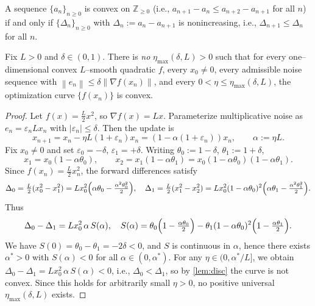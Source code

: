 \documentclass[10pt,a4paper]{amsart}
\newcommand{\norm}[1]{\left\lVert #1\right\rVert}
\begin{document}
\begin{lemma}\label{lem:disc}
A sequence $\{a_n\}_{n\ge0}$ is convex on $\mathbb{Z}_{\ge0}$ (i.e., $a_{n+1}-a_n\le a_{n+2}-a_{n+1}$ for all $n$) if and only if $\{\Delta_n\}_{n\ge0}$ with $\Delta_n:=a_n-a_{n+1}$ is nonincreasing, i.e., $\Delta_{n+1}\le \Delta_n$ for all $n$.
\end{lemma}

\begin{theorem}\label{thm:imposs}
Fix $L>0$ and $\delta\in(0,1)$. There is \emph{no} $\eta_{\max}(\delta,L)>0$ such that for every one--dimensional convex $L$--smooth quadratic $f$, every $x_0\ne0$, every admissible noise sequence with $\norm{e_n}\le\delta\norm{\nabla f(x_n)}$, and every $0<\eta\le \eta_{\max}(\delta,L)$, the optimization curve $\{f(x_n)\}$ is convex.
\end{theorem}

\begin{proof}
Let $f(x)=\tfrac{L}{2}x^2$, so $\nabla f(x)=Lx$. Parameterize multiplicative noise as $e_n=\varepsilon_n Lx_n$ with $|\varepsilon_n|\le \delta$. Then the update is
\[
x_{n+1}=x_n-\eta L(1+\varepsilon_n)x_n=(1-\alpha(1+\varepsilon_n))x_n,\qquad \alpha:=\eta L.
\]
Fix $x_0\ne0$ and set $\varepsilon_0=-\delta$, $\varepsilon_1=+\delta$. Writing $\theta_0:=1-\delta$, $\theta_1:=1+\delta$,
\[
x_1=x_0(1-\alpha\theta_0),\qquad x_2=x_1(1-\alpha\theta_1)=x_0(1-\alpha\theta_0)(1-\alpha\theta_1).
\]
Since $f(x_n)=\tfrac{L}{2}x_n^2$, the forward differences satisfy
\[
\Delta_0=\tfrac{L}{2}(x_0^2-x_1^2)=Lx_0^2\Bigl(\alpha\theta_0-\tfrac{\alpha^2\theta_0^2}{2}\Bigr),\quad
\Delta_1=\tfrac{L}{2}(x_1^2-x_2^2)=Lx_0^2(1-\alpha\theta_0)^2\Bigl(\alpha\theta_1-\tfrac{\alpha^2\theta_1^2}{2}\Bigr).
\]
Thus
\[
\Delta_0-\Delta_1=Lx_0^2\,\alpha\,S(\alpha),
\quad
S(\alpha)=\theta_0\Bigl(1-\tfrac{\alpha\theta_0}{2}\Bigr)-\theta_1(1-\alpha\theta_0)^2\Bigl(1-\tfrac{\alpha\theta_1}{2}\Bigr).
\]
We have $S(0)=\theta_0-\theta_1=-2\delta<0$, and $S$ is continuous in $\alpha$, hence there exists $\alpha^\ast>0$ with $S(\alpha)<0$ for all $\alpha\in(0,\alpha^\ast)$. For any $\eta\in(0,\alpha^\ast/L]$, we obtain $\Delta_0-\Delta_1=Lx_0^2\,\alpha\,S(\alpha)<0$, i.e., $\Delta_0<\Delta_1$, so by \cref{lem:disc} the curve is not convex. Since this holds for arbitrarily small $\eta>0$, no positive universal $\eta_{\max}(\delta,L)$ exists.
\end{proof}
\end{document}
